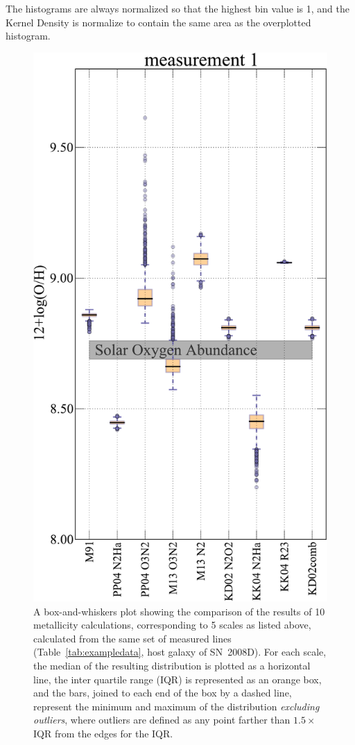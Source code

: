 \documentclass{emulateapj}
\begin{document}
The histograms are always normalized so that the highest bin value is 1, and the Kernel Density is normalize to contain the same area as the overplotted histogram. 


\begin{figure}[ht!]
  \includegraphics[width=0.95\columnwidth]{exampledata_boxplot2000_m1.pdf}
   \caption{A box-and-whiskers plot showing the comparison of the results of 10 metallicity calculations, corresponding to 5 scales as listed above, calculated from the same set of measured lines (Table~\ref{tab:exampledata}, host galaxy of SN~2008D). For each scale, the median of the resulting distribution is plotted as a horizontal line, the inter quartile range (IQR) is represented as an orange box, and the bars, joined to each end of the box by a dashed line, represent the minimum and maximum of the distribution \emph{excluding outliers}, where outliers are defined as any point farther than $1.5\times$ IQR from the edges for the IQR.}
 \label{boxplot}
\end{figure}
\end{document}
